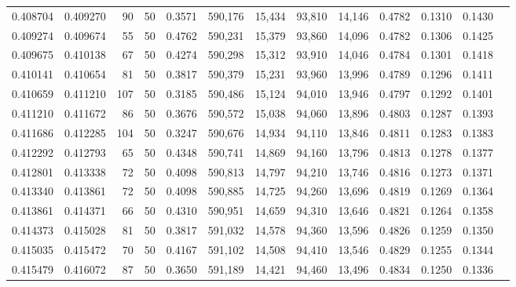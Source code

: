 \begin{tabular}{rrrrrrrrrrrrr}
0.408704 & 0.409270 &    90 &  50 &                                     0.3571 & 590,176 &  15,434 &  93,810 &  14,146 & 0.4782 & 0.1310 & 0.1430 \\
0.409274 & 0.409674 &    55 &  50 &                                     0.4762 & 590,231 &  15,379 &  93,860 &  14,096 & 0.4782 & 0.1306 & 0.1425 \\
0.409675 & 0.410138 &    67 &  50 &                                     0.4274 & 590,298 &  15,312 &  93,910 &  14,046 & 0.4784 & 0.1301 & 0.1418 \\
0.410141 & 0.410654 &    81 &  50 &                                     0.3817 & 590,379 &  15,231 &  93,960 &  13,996 & 0.4789 & 0.1296 & 0.1411 \\
0.410659 & 0.411210 &   107 &  50 &                                     0.3185 & 590,486 &  15,124 &  94,010 &  13,946 & 0.4797 & 0.1292 & 0.1401 \\
0.411210 & 0.411672 &    86 &  50 &                                     0.3676 & 590,572 &  15,038 &  94,060 &  13,896 & 0.4803 & 0.1287 & 0.1393 \\
0.411686 & 0.412285 &   104 &  50 &                                     0.3247 & 590,676 &  14,934 &  94,110 &  13,846 & 0.4811 & 0.1283 & 0.1383 \\
0.412292 & 0.412793 &    65 &  50 &                                     0.4348 & 590,741 &  14,869 &  94,160 &  13,796 & 0.4813 & 0.1278 & 0.1377 \\
0.412801 & 0.413338 &    72 &  50 &                                     0.4098 & 590,813 &  14,797 &  94,210 &  13,746 & 0.4816 & 0.1273 & 0.1371 \\
0.413340 & 0.413861 &    72 &  50 &                                     0.4098 & 590,885 &  14,725 &  94,260 &  13,696 & 0.4819 & 0.1269 & 0.1364 \\
0.413861 & 0.414371 &    66 &  50 &                                     0.4310 & 590,951 &  14,659 &  94,310 &  13,646 & 0.4821 & 0.1264 & 0.1358 \\
0.414373 & 0.415028 &    81 &  50 &                                     0.3817 & 591,032 &  14,578 &  94,360 &  13,596 & 0.4826 & 0.1259 & 0.1350 \\
0.415035 & 0.415472 &    70 &  50 &                                     0.4167 & 591,102 &  14,508 &  94,410 &  13,546 & 0.4829 & 0.1255 & 0.1344 \\
0.415479 & 0.416072 &    87 &  50 &                                     0.3650 & 591,189 &  14,421 &  94,460 &  13,496 & 0.4834 & 0.1250 & 0.1336 \\

\end{tabular}
